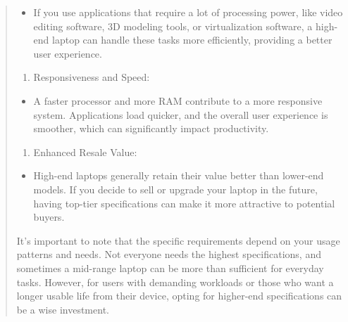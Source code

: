 \documentclass[14pt, letterpaper,twoside]{extreport}
\begin{document}
\begin{quote}
    \begin{itemize}

        \item
              If you use applications that require a lot of processing power, like video editing software, 3D modeling tools, or virtualization software, a high-end laptop can handle these tasks more efficiently, providing a better user experience.
    \end{itemize}
    
    \begin{enumerate}
        \def\labelenumi{\arabic{enumi}.}
        \setcounter{enumi}{6}
        
        \item
              Responsiveness and Speed:
    \end{enumerate}
    
    \begin{itemize}

        \item
              A faster processor and more RAM contribute to a more responsive system. Applications load quicker, and the overall user experience is smoother, which can significantly impact productivity.
    \end{itemize}
    
    \begin{enumerate}
        \def\labelenumi{\arabic{enumi}.}
        \setcounter{enumi}{7}
        
        \item
              Enhanced Resale Value:
    \end{enumerate}
    
    \begin{itemize}

        \item
              High-end laptops generally retain their value better than lower-end models. If you decide to sell or upgrade your laptop in the future, having top-tier specifications can make it more attractive to potential buyers.
    \end{itemize}
    
    It's important to note that the specific requirements depend on your usage patterns and needs. Not everyone needs the highest specifications, and sometimes a mid-range laptop can be more than sufficient for everyday tasks. However, for users with demanding workloads or those who want a longer usable life from their device, opting for higher-end specifications can be a wise investment.
\end{quote}
\end{document}
